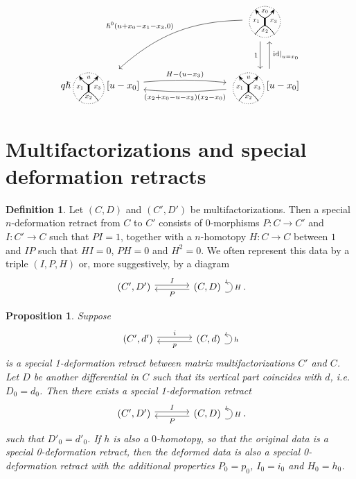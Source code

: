 \documentclass{article}
\newcommand{\DD}{\mathcal{D}}
\newcommand{\id}{\mathrm{id}}
\DeclareMathOperator{\Ext}{Ext}
\newcommand{\sdr}[5]{%
  \begin{tikzcd}[column sep=large, ampersand replacement=\&]
    {#1} \arrow[r, "#3", shift left=0.5ex,] \arrow[r, leftarrow, "#4", shift right=0.5ex, swap] \& 
    {#2} \arrow[loop right, distance=1em, in=15, out=-15, "#5",swap]
  \end{tikzcd}%
}
\theoremstyle{plain} %
\newtheorem{lemma}[theorem]{Lemma}
\newtheorem{proposition}[theorem]{Proposition}
\theoremstyle{definition} %
\newtheorem{definition}[theorem]{Definition}
\theoremstyle{remark} %
\begin{document}
\[
\begin{tikzcd}[column sep=3cm, row sep=1cm]
	& \scalebox{0.7}{\ThickEdgeStandard} \arrow[d, shift right=2, "1", swap] \arrow[dl, bend right=20, "{\hslash^0(u+x_0-x_1-x_3,0)}", swap] \\
	q\hslash \scalebox{0.7}{\ThickEdge{u}{x_1}{x_2}{x_3}}[u-x_0] \arrow[r, "H-(u-x_3)", bend left=5]& \scalebox{0.7}{\ThickEdge{u}{x_1}{x_2}{x_3}}[u-x_0] \arrow[l, "(x_2+x_0-u-x_3)(x_2-x_0)", bend left=5]\arrow[u, shift right=2, "{\left.\id\right|_{u=x_0}}",swap]
\end{tikzcd}
\]



%
%
%
%
%
%

\section{Multifactorizations and special deformation retracts}
\begin{definition}
	Let $(C,D)$ and $(C',D')$ be multifactorizations. Then a special $n$-deformation retract from $C$ to $C'$ consists of 0-morphisms $P:C\to C'$ and $I:C'\to C$ such that $PI=1$, together with a $n$-homotopy $H:C\to C$ between $1$ and $IP$ such that $HI=0$, $PH=0$ and $H^2=0$. We often represent this data by a triple $(I,P,H)$ or, more suggestively, by a diagram
	$$
		\sdr{(C',D')}{(C,D)}{I}{P}{H}
		.
	$$
\end{definition}

\begin{proposition}\label{specialDefRetract}
	Suppose 
	$$\sdr{(C',d')}{(C,d)}{i}{p}{h}$$
	is a special 1-deformation retract between matrix multifactorizations $C'$ and $C$. Let $D$ be another differential in $C$ such that its vertical part coincides with $d$, i.e. $D_0=d_0$. Then there exists a special 1-deformation retract
	$$\sdr{(C',D')}{(C,D)}{I}{P}{H}.$$
	such that $D'_0=d'_0$.
	If $h$ is also a $0$-homotopy, so that the original data is a special 0-deformation retract, then the deformed data is also a special 0-deformation retract with the additional properties $P_0=p_0$, $I_0=i_0$ and $H_0=h_0$.
\end{proposition}
\end{document}
